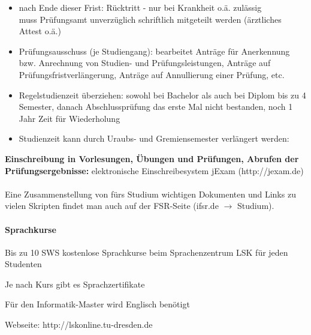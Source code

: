 \documentclass[a4paper,12pt]{report}
\begin{document}
\begin{itemize}
	\item nach Ende dieser Frist: Rücktritt - nur bei Krankheit o.ä. zulässig\\ 
		muss Prüfungsamt unverzüglich schriftlich mitgeteilt werden (ärztliches Attest o.ä.)
	\item Prüfungsausschuss (je Studiengang): bearbeitet Anträge für Anerkennung bzw. Anrechnung von Studien- und Prüfungsleistungen, Anträge auf Prüfungsfristverlängerung, Anträge auf Annullierung einer Prüfung, etc.
	\item Regelstudienzeit überziehen: sowohl bei Bachelor als auch bei Diplom bis zu 4 Semester, danach Abschlussprüfung das erste Mal nicht bestanden, noch 1 Jahr Zeit für Wiederholung
	\item Studienzeit kann durch Uraubs- und Gremiensemester verlängert werden:
\end{itemize}

\textbf{Einschreibung in Vorlesungen, Übungen und Prüfungen, Abrufen der Prüfungsergebnisse: }elektronische Einschreibesystem jExam (http://jexam.de)\\\\
Eine Zusammenstellung von fürs Studium wichtigen Dokumenten und Links zu vielen Skripten findet man auch auf der FSR-Seite (ifsr.de $\rightarrow$ Studium).

\paragraph{Sprachkurse}
\begin{itemize*}
\item Bis zu 10 SWS kostenlose Sprachkurse beim Sprachenzentrum LSK für jeden Studenten
\item Je nach Kurs gibt es Sprachzertifikate
\item Für den Informatik-Master wird Englisch benötigt
\item Webseite: http://lskonline.tu-dresden.de
\end{itemize*}
\end{document}
